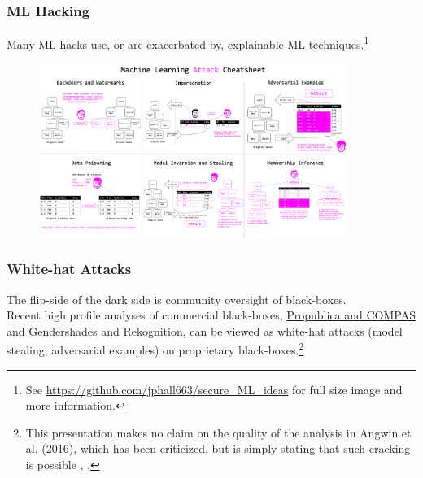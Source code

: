 \documentclass[11pt,
               aspectratio=169,
               hyperref={colorlinks}
               ]{beamer}
\begin{document}
	\begin{frame}
	
		\frametitle{ML Hacking}
		
\footnotesize{Many ML hacks use, or are exacerbated by, explainable ML techniques.}\footnote{\tiny{See \url{https://github.com/jphall663/secure_ML_ideas} for full size image and more information.}}
				\begin{figure}
					\begin{center}
						\includegraphics[height=160pt]{img/cheatsheet.png}
					\end{center}
				\end{figure}	
				\normalsize
	
	\end{frame}
	
	\begin{frame}
	
		\frametitle{White-hat Attacks}
		
		The flip-side of the dark side is community oversight of black-boxes.\\
		\vspace{10pt}
		Recent high profile analyses of commercial black-boxes, \href{https://www.propublica.org/article/machine-bias-risk-assessments-in-criminal-sentencing}{Propublica and COMPAS} and \href{https://medium.com/@Joy.Buolamwini/response-racial-and-gender-bias-in-amazon-rekognition-commercial-ai-system-for-analyzing-faces-a289222eeced}{Gendershades and Rekognition}, can be viewed as white-hat attacks (model stealing, adversarial examples) on proprietary black-boxes.\footnote{This presentation makes no claim on the quality of the analysis in Angwin et al. (2016), which has been criticized, but is simply stating that such cracking is possible \cite{angwin16,}, \cite{flores2016false}.} 

	\end{frame}
	
\end{document}
